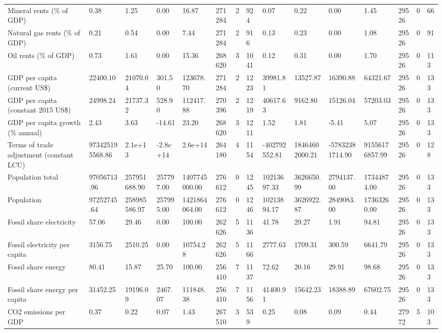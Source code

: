 \begin{longtable}{lllllllllllllll}
\addlinespace
Mineral rents (\% of GDP) & 0.38 & 1.25 & 0.00 & 16.87 & 271284 & 2 & 924 & 0.07 & 0.22 & 0.00 & 1.45 & 29526 & 0 & 66\\
Natural gas rents (\% of GDP) & 0.21 & 0.54 & 0.00 & 7.44 & 271284 & 2 & 916 & 0.13 & 0.23 & 0.00 & 1.08 & 29526 & 0 & 91\\
Oil rents (\% of GDP) & 0.73 & 1.61 & 0.00 & 15.36 & 268620 & 3 & 1041 & 0.12 & 0.31 & 0.00 & 1.70 & 29526 & 0 & 113\\
GDP per capita (current US\$) & 22400.10 & 21070.04 & 301.50 & 123678.70 & 271284 & 2 & 1223 & 39981.81 & 13527.87 & 16390.88 & 64321.67 & 29526 & 0 & 133\\
GDP per capita (constant 2015 US\$) & 24998.24 & 21737.32 & 528.90 & 112417.88 & 270396 & 2 & 1219 & 40617.63 & 9162.80 & 15126.04 & 57203.03 & 29526 & 0 & 133\\
\addlinespace
GDP per capita growth (\% annual) & 2.43 & 3.63 & -14.61 & 23.20 & 268620 & 3 & 1211 & 1.52 & 1.81 & -5.41 & 5.07 & 29526 & 0 & 133\\
Terms of trade adjustment (constant LCU) & 973425195568.86 & 2.1e+13 & -2.8e+14 & 2.6e+14 & 264180 & 4 & 1154 & -402792552.81 & 18464602000.21 & -57832381714.90 & 91556176857.99 & 29526 & 0 & 128\\
Population total & 97056713.96 & 257951688.90 & 257797.00 & 1407745000.00 & 276612 & 0 & 1245 & 10213697.33 & 3626650.99 & 2794137.00 & 17344874.00 & 29526 & 0 & 133\\
Population & 97252745.64 & 258985586.97 & 257995.00 & 1421864064.00 & 276612 & 0 & 1246 & 10213894.17 & 3626922.87 & 2849083.00 & 17363260.00 & 29526 & 0 & 133\\
Fossil share electricity & 57.06 & 29.46 & 0.00 & 100.00 & 262626 & 5 & 1136 & 41.78 & 29.27 & 1.91 & 94.81 & 29526 & 0 & 133\\
\addlinespace
Fossil electricity per capita & 3156.75 & 2510.25 & 0.00 & 10754.28 & 262626 & 5 & 1166 & 2777.63 & 1709.31 & 300.59 & 6641.79 & 29526 & 0 & 133\\
Fossil share energy & 80.41 & 15.87 & 25.70 & 100.00 & 256410 & 7 & 1137 & 72.62 & 20.16 & 29.91 & 98.68 & 29526 & 0 & 133\\
Fossil share energy per capita & 31452.25 & 19196.09 & 2467.07 & 111848.38 & 256410 & 7 & 1156 & 41400.91 & 15642.23 & 18388.89 & 67602.75 & 29526 & 0 & 133\\
CO2 emissions per GDP & 0.37 & 0.22 & 0.07 & 1.43 & 267510 & 3 & 539 & 0.25 & 0.08 & 0.09 & 0.44 & 27972 & 5 & 103\\

\end{longtable}
